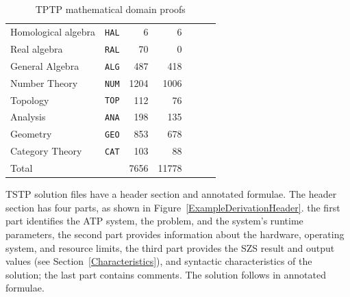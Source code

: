 \documentclass[runningheads]{llncs}
\begin{document}
\begin{table}[htb]
\begin{center}
\begin{tabular}{lr|rrrrr}
Homological algebra & {\tt HAL} &    6 &    6 &     &      &       \\
Real algebra        & {\tt RAL} &   70 &    0 &     &      &       \\
General Algebra     & {\tt ALG} &  487 &  418 &     &      &       \\
Number Theory       & {\tt NUM} & 1204 & 1006 &     &      &       \\
Topology            & {\tt TOP} &  112 &   76 &     &      &       \\
Analysis            & {\tt ANA} &  198 &  135 &     &      &       \\
Geometry            & {\tt GEO} &  853 &  678 &     &      &       \\
Category Theory     & {\tt CAT} &  103 &   88 &     &      &       \\
\hline
Total               &           & 7656 &11778 &     &      &       \\
\end{tabular}
\end{center}
\caption{TPTP mathematical domain proofs}
\label{Proofs}
\end{table}

TSTP solution files have a header section and annotated formulae.
The header section has four parts, as shown in Figure~\ref{ExampleDerivationHeader}.
the first part identifies the ATP system, the problem, and the system's runtime parameters,
the second part provides information about the hardware, operating system, and resource limits,
the third part provides the SZS result and output values (see Section~\ref{Characteristics}), 
and syntactic characteristics of the solution; the last part contains comments.
The solution follows in annotated formulae.
\end{document}
